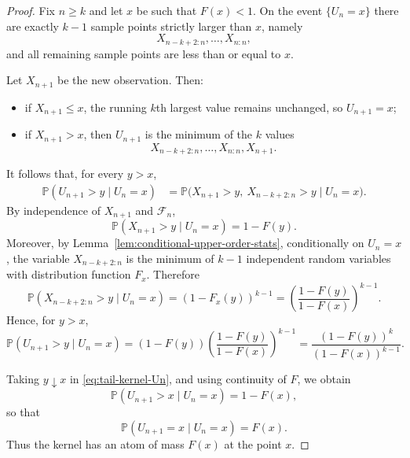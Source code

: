 \documentclass[12pt]{article}
\theoremstyle{definition}
\begin{document}
\begin{proof}
Fix $n\ge k$ and let $x$ be such that $F(x)<1$. On the event $\{U_n=x\}$ there are exactly $k-1$ sample points strictly larger than $x$, namely
\[
X_{n-k+2:n},\dots,X_{n:n},
\]
and all remaining sample points are less than or equal to $x$.

Let $X_{n+1}$ be the new observation. Then:
\begin{itemize}
\item if $X_{n+1}\le x$, the running $k$th largest value remains unchanged, so $U_{n+1}=x$;
\item if $X_{n+1}>x$, then $U_{n+1}$ is the minimum of the $k$ values
\[
X_{n-k+2:n},\dots,X_{n:n},X_{n+1}.
\]
\end{itemize}

It follows that, for every $y>x$,
\begin{align*}
\mathbb{P}(U_{n+1}>y\mid U_n=x)
&=
\mathbb{P}\bigl(X_{n+1}>y,\ X_{n-k+2:n}>y \mid U_n=x\bigr).
\end{align*}
By independence of $X_{n+1}$ and $\mathcal{F}_n$,
\[
\mathbb{P}(X_{n+1}>y\mid U_n=x)=1-F(y).
\]
Moreover, by Lemma~\ref{lem:conditional-upper-order-stats}, conditionally on $U_n=x$, the variable $X_{n-k+2:n}$ is the minimum of $k-1$ independent random variables with distribution function $F_x$. Therefore
\[
\mathbb{P}(X_{n-k+2:n}>y\mid U_n=x)
=
\left(1-F_x(y)\right)^{k-1}
=
\left(\frac{1-F(y)}{1-F(x)}\right)^{k-1}.
\]
Hence, for $y>x$,
\begin{equation}
\label{eq:tail-kernel-Un}
\mathbb{P}(U_{n+1}>y\mid U_n=x)
=
(1-F(y))
\left(\frac{1-F(y)}{1-F(x)}\right)^{k-1}
=
\frac{(1-F(y))^k}{(1-F(x))^{k-1}}.
\end{equation}

Taking $y\downarrow x$ in \eqref{eq:tail-kernel-Un}, and using continuity of $F$, we obtain
\[
\mathbb{P}(U_{n+1}>x\mid U_n=x)=1-F(x),
\]
so that
\[
\mathbb{P}(U_{n+1}=x\mid U_n=x)=F(x).
\]
Thus the kernel has an atom of mass $F(x)$ at the point $x$.


\end{proof}
\end{document}
